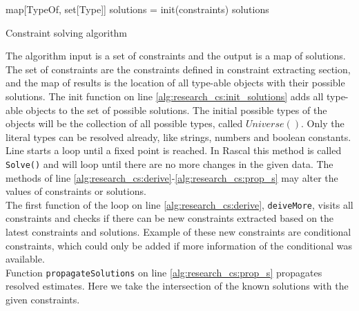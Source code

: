 \documentclass[../main.tex]{subfiles}
\begin{document}
    \vspace{5 mm}
    \begin{algorithm}[H]
     \BlankLine
	 map[TypeOf, set[Type]] solutions = init(constraints)\;           \label{alg:research_cs:init_solutions}
     \BlankLine
	                                                                  \label{alg:research_cs:loop_end}
	 \BlankLine
	 \Return solutions\;     \label{alg:research_cs:return}
	 \caption{Constraint solving algorithm}
	 \label{alg:research_cs}
	\end{algorithm}
    
    
    The algorithm input is a set of constraints and the output is a map of solutions.
    The set of constraints are the constraints defined in constraint extracting section, and the map of results is the location of all type-able objects with their possible solutions.
    The init function on line \ref{alg:research_cs:init_solutions} adds all type-able objects to the set of possible solutions.
    The initial possible types of the objects will be the collection of all possible types, called $Universe()$.
    Only the literal types can be resolved already, like strings, numbers and boolean constants.
    \\
    Line \label{alg:research_cs:loop_start} starts a loop until a fixed point is reached. 
    In Rascal this method is called \texttt{Solve()} and will loop until there are no more changes in the given data.
    The methods of line \ref{alg:research_cs:derive}-\ref{alg:research_cs:prop_s} may alter the values of constraints or solutions.
    \\
    The first function of the loop on line \ref{alg:research_cs:derive}, \texttt{deiveMore}, visits all constraints and checks if there can be new constraints extracted based on the latest constraints and solutions.
    Example of these new constraints are conditional constraints, which could only be added if more information of the conditional was available.
    \\
    Function \texttt{propagateSolutions} on line \ref{alg:research_cs:prop_s} propagates resolved estimates. 
    Here we take the intersection of the known solutions with the given constraints.
\end{document}
